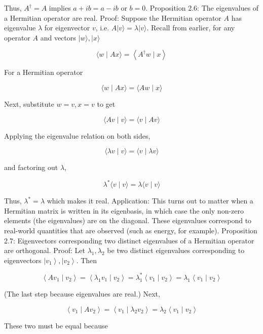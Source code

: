 \documentclass[main.tex]{subfiles}
\begin{document}
    Thus, $A^{\dagger}=A$ implies $a+i b=a-i b$ or $b=0$. Proposition 2.6: The eigenvalues of a Hermitian operator are real. Proof: Suppose the Hermitian operator $A$ has eigenvalue $\lambda$ for eigenvector $v$, i.e. $A|v\rangle=\lambda|v\rangle$. Recall from earlier, for any operator $A$ and vectors $|w\rangle,|x\rangle$
    
    $$
    \langle w \mid A x\rangle=\left\langle A^{\dagger} w \mid x\right\rangle
    $$
    
    For a Hermitian operator
    
    $$
    \langle w \mid A x\rangle=\langle A w \mid x\rangle
    $$
    
    Next, substitute $w=v, x=v$ to get
    
    $$
    \langle A v \mid v\rangle=\langle v \mid A v\rangle
    $$
    
    Applying the eigenvalue relation on both sides,
    
    $$
    \langle\lambda v \mid v\rangle=\langle v \mid \lambda v\rangle
    $$
    
    and factoring out $\lambda$,
    
    $$
    \lambda^{*}\langle v \mid v\rangle=\lambda\langle v \mid v\rangle
    $$
    
    Thus, $\lambda^{*}=\lambda$ which makes it real. Application: This turns out to matter when a Hermitian matrix is written in its eigenbasis, in which case the only non-zero elements (the eigenvalues) are on the diagonal. These eigenvalues correspond to real-world quantities that are observed (such as energy, for example). Proposition 2.7: Eigenvectors corresponding two distinct eigenvalues of a Hermitian operator are orthogonal. Proof: Let $\lambda_{1}, \lambda_{2}$ be two distinct eigenvalues corresponding to eigenvectors $\left|v_{1}\right\rangle,\left|v_{2}\right\rangle$. Then
    
    $$
    \left\langle A v_{1} \mid v_{2}\right\rangle=\left\langle\lambda_{1} v_{1} \mid v_{2}\right\rangle=\lambda_{1}^{*}\left\langle v_{1} \mid v_{2}\right\rangle=\lambda_{1}\left\langle v_{1} \mid v_{2}\right\rangle
    $$
    
    (The last step because eigenvalues are real.) Next,
    
    $$
    \left\langle v_{1} \mid A v_{2}\right\rangle=\left\langle v_{1} \mid \lambda_{2} v_{2}\right\rangle=\lambda_{2}\left\langle v_{1} \mid v_{2}\right\rangle
    $$
    
    These two must be equal because
    
\end{document}
